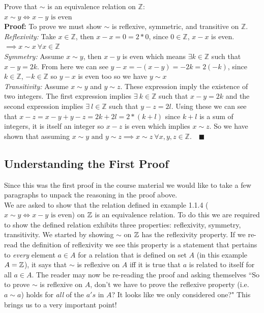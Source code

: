 \begin{example}
Prove that $\sim$ is an equivalence relation on $\mathbb{Z}$:\\
$x\sim y \iff x-y \text{ is even}$\steezybreak\\

\noindent\textbf{Proof:} To prove we must show $\sim$ is reflexive, symmetric, and transitive on $\mathbb{Z}$.\\
\textit{Reflexivity:} Take $x\in \mathbb{Z}$, then $x-x=0=2*0$, since $0\in \mathbb{Z}$, $x-x$ is even. $\implies x\sim x \ \forall x \in \mathbb{Z}$\\
\textit{Symmetry:} Assume $x\sim y$, then $x-y$ is even which means $\exists k \in \mathbb{Z}$ such that $x-y=2k$. From here we can see $y-x=-(x-y)=-2k=2(-k)$, since $k\in \mathbb{Z}$, $-k\in \mathbb{Z}$ so $y-x$ is even too so we have $y\sim x$\\
\textit{Transitivity:} Assume $x\sim y$ and $y \sim z$. These expression imply the existence of two integers. The first expression implies $\exists \ k\in \mathbb{Z}$ such that $x-y=2k$ and the second expression implies $\exists \ l \in \mathbb{Z}$ such that $y-z=2l$. Using these we can see that $x-z=x-y+y-z=2k+2l=2*(k+l)$ since $k+l$ is a sum of integers, it is itself an integer so $x-z$ is even which implies $x\sim z$. So we have shown that assuming $x\sim y \text{ and } y\sim z \implies x\sim z \ \forall x,y,z \in \mathbb{Z}$. $\ \ \ \blacksquare$
\end{example}
\subsection{Understanding the First Proof}
Since this was the first proof in the course material we would like to take a few paragraphs to unpack the reasoning in the proof above. \steezybreak\\
\noindent We are asked to show that the relation defined in example 1.1.4 ($x\sim y \iff x-y \text{ is even}$) on ${\mathbb{ Z}}$ is an equivalence relation. To do this we are required to show the defined relation exhibits three properties: reflexivity, symmetry, transitivity. We started by showing $\sim$ on ${\mathbb{ Z}}$ has the reflexivity property. If we re-read the definition of reflexivity we see this property is a statement that pertains to \textit{every} element $a\in A$ for a relation that is defined on set $A$ (in this example $A={\mathbb{ Z}}$), it says that $\sim$ is reflexive on $A$ iff it is true that $a$ is related to itself for all $a\in A$. The reader may now be re-reading the proof and asking themselves ``So to prove $\sim$ is reflexive on $A$, don't we have to prove the reflexive property (i.e. $a\sim a$) holds for \textit{all} of the $a's$ in $A$? It looks like we only considered one?" This brings us to a very important point! \steezybreak\\

